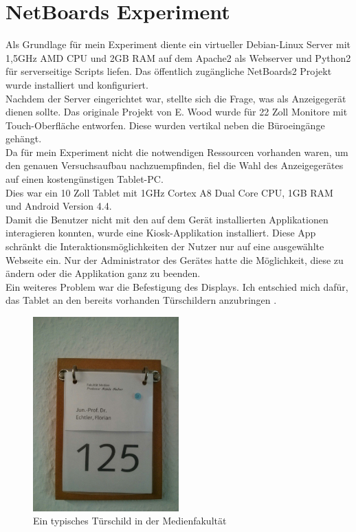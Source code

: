 \section{NetBoards Experiment}\label{NetBoards Experiment}
Als Grundlage für mein Experiment diente ein virtueller Debian-Linux Server mit 1,5GHz AMD CPU und 2GB RAM auf dem Apache2 als Webserver und Python2 für serverseitige Scripts liefen. Das öffentlich zugängliche NetBoards2 Projekt wurde installiert und konfiguriert.
\\
Nachdem der Server eingerichtet war, stellte sich die Frage, was als Anzeigegerät dienen sollte. Das originale Projekt von E. Wood wurde für 22 Zoll Monitore mit Touch-Oberfläche entworfen. Diese wurden vertikal neben die Büroeingänge gehängt.
\\
Da für mein Experiment nicht die notwendigen Ressourcen vorhanden waren, um den genauen Versuchsaufbau nachzuempfinden, fiel die Wahl des Anzeigegerätes auf einen kostengünstigen Tablet-PC.
\\
Dies war ein 10 Zoll Tablet mit 1GHz Cortex A8 Dual Core CPU, 1GB RAM und Android Version 4.4.
\\
Damit die Benutzer nicht mit den auf dem Gerät installierten Applikationen interagieren konnten, wurde eine Kiosk-Applikation installiert.
Diese App schränkt die Interaktionsmöglichkeiten der Nutzer nur auf eine ausgewählte Webseite ein. Nur der Administrator des Gerätes hatte die Möglichkeit, diese zu ändern oder die Applikation ganz zu beenden.
\\
Ein weiteres Problem war die Befestigung des Displays.
Ich entschied mich dafür, das Tablet an den bereits vorhanden Türschildern anzubringen .
\begin{figure}[h!]
  \centering
    \includegraphics[width=0.5\textwidth]{./img/Tuerschild.jpg}
  \caption{Ein typisches Türschild in der Medienfakultät\\}
  \label{img:tuerschild}
\end{figure}\\
